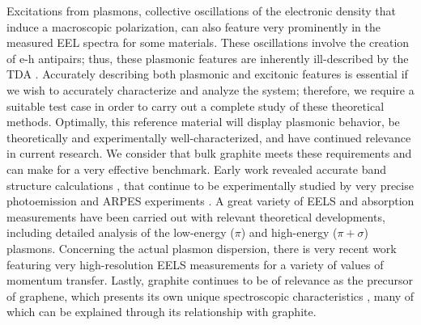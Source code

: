 \documentclass[aps,prb,10pt,showpacs,superscriptaddress,twocolumn,notitlepage]{revtex4-1}
\begin{document}
Excitations from plasmons, collective oscillations of the electronic density
that induce a macroscopic polarization, can also feature very prominently in the
measured EEL spectra for some materials. These oscillations involve the creation
of e-h antipairs; thus, these plasmonic features are inherently ill-described by
the TDA \cite{zimmermannPSSB70, caliebePRL00, olevanoPRL01, gruningNL09}.
Accurately describing both plasmonic and excitonic features is essential if we
wish to accurately characterize and analyze the system; therefore, we require a
suitable test case in order to carry out a complete study of these theoretical
methods. Optimally, this reference material will display plasmonic behavior, be
theoretically and experimentally well-characterized, and have continued
relevance in current research. We consider that bulk graphite meets these
requirements and can make for a very effective benchmark. Early work revealed
accurate band structure calculations \cite{bassaniINCB1967, painterPRB70}, that
continue to be experimentally studied by very precise photoemission and ARPES
experiments \cite{gruneisPRL08, matsuiPRB18}. A great variety of EELS
\cite{taftPR65, zeppenfeldZP71, venghausPSSB1974, buchnerPSSB77,
marinopoulosPRL02, krambergerPRL08} and absorption \cite{linPRB97,
krambergerPRL08, trevisanuttoPRB10} measurements have been carried out with
relevant theoretical developments, including detailed analysis of the low-energy
($\pi$) and high-energy ($\pi + \sigma$) plasmons. Concerning the actual plasmon
dispersion, there is very recent work \cite{kinyanjuiEPL12, liouPRB15} featuring
very high-resolution EELS measurements for a variety of values of momentum
transfer. Lastly, graphite continues to be of relevance as the precursor of
graphene, which presents its own unique spectroscopic characteristics
\cite{yangPRL09, tegenkampJPCM11, politanoNS14, liouPRB15, bulushevaIJQC16,
liPRB17}, many of which can be explained through its relationship with graphite.
\end{document}
